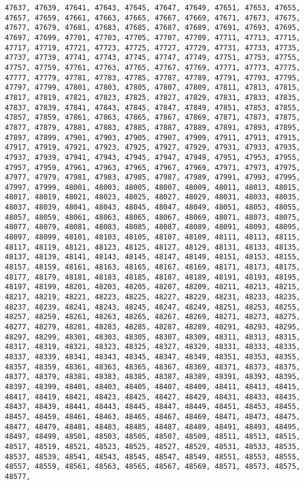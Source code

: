 \documentclass[11pt]{article}
\begin{document}
\begin{Verbatim}[commandchars=\\\{\}]
47637, 47639, 47641, 47643, 47645, 47647, 47649, 47651, 47653, 47655, 47657, 47659, 47661, 47663, 47665, 47667, 47669, 47671, 47673, 47675, 47677, 47679, 47681, 47683, 47685, 47687, 47689, 47691, 47693, 47695, 47697, 47699, 47701, 47703, 47705, 47707, 47709, 47711, 47713, 47715, 47717, 47719, 47721, 47723, 47725, 47727, 47729, 47731, 47733, 47735, 47737, 47739, 47741, 47743, 47745, 47747, 47749, 47751, 47753, 47755, 47757, 47759, 47761, 47763, 47765, 47767, 47769, 47771, 47773, 47775, 47777, 47779, 47781, 47783, 47785, 47787, 47789, 47791, 47793, 47795, 47797, 47799, 47801, 47803, 47805, 47807, 47809, 47811, 47813, 47815, 47817, 47819, 47821, 47823, 47825, 47827, 47829, 47831, 47833, 47835, 47837, 47839, 47841, 47843, 47845, 47847, 47849, 47851, 47853, 47855, 47857, 47859, 47861, 47863, 47865, 47867, 47869, 47871, 47873, 47875, 47877, 47879, 47881, 47883, 47885, 47887, 47889, 47891, 47893, 47895, 47897, 47899, 47901, 47903, 47905, 47907, 47909, 47911, 47913, 47915, 47917, 47919, 47921, 47923, 47925, 47927, 47929, 47931, 47933, 47935, 47937, 47939, 47941, 47943, 47945, 47947, 47949, 47951, 47953, 47955, 47957, 47959, 47961, 47963, 47965, 47967, 47969, 47971, 47973, 47975, 47977, 47979, 47981, 47983, 47985, 47987, 47989, 47991, 47993, 47995, 47997, 47999, 48001, 48003, 48005, 48007, 48009, 48011, 48013, 48015, 48017, 48019, 48021, 48023, 48025, 48027, 48029, 48031, 48033, 48035, 48037, 48039, 48041, 48043, 48045, 48047, 48049, 48051, 48053, 48055, 48057, 48059, 48061, 48063, 48065, 48067, 48069, 48071, 48073, 48075, 48077, 48079, 48081, 48083, 48085, 48087, 48089, 48091, 48093, 48095, 48097, 48099, 48101, 48103, 48105, 48107, 48109, 48111, 48113, 48115, 48117, 48119, 48121, 48123, 48125, 48127, 48129, 48131, 48133, 48135, 48137, 48139, 48141, 48143, 48145, 48147, 48149, 48151, 48153, 48155, 48157, 48159, 48161, 48163, 48165, 48167, 48169, 48171, 48173, 48175, 48177, 48179, 48181, 48183, 48185, 48187, 48189, 48191, 48193, 48195, 48197, 48199, 48201, 48203, 48205, 48207, 48209, 48211, 48213, 48215, 48217, 48219, 48221, 48223, 48225, 48227, 48229, 48231, 48233, 48235, 48237, 48239, 48241, 48243, 48245, 48247, 48249, 48251, 48253, 48255, 48257, 48259, 48261, 48263, 48265, 48267, 48269, 48271, 48273, 48275, 48277, 48279, 48281, 48283, 48285, 48287, 48289, 48291, 48293, 48295, 48297, 48299, 48301, 48303, 48305, 48307, 48309, 48311, 48313, 48315, 48317, 48319, 48321, 48323, 48325, 48327, 48329, 48331, 48333, 48335, 48337, 48339, 48341, 48343, 48345, 48347, 48349, 48351, 48353, 48355, 48357, 48359, 48361, 48363, 48365, 48367, 48369, 48371, 48373, 48375, 48377, 48379, 48381, 48383, 48385, 48387, 48389, 48391, 48393, 48395, 48397, 48399, 48401, 48403, 48405, 48407, 48409, 48411, 48413, 48415, 48417, 48419, 48421, 48423, 48425, 48427, 48429, 48431, 48433, 48435, 48437, 48439, 48441, 48443, 48445, 48447, 48449, 48451, 48453, 48455, 48457, 48459, 48461, 48463, 48465, 48467, 48469, 48471, 48473, 48475, 48477, 48479, 48481, 48483, 48485, 48487, 48489, 48491, 48493, 48495, 48497, 48499, 48501, 48503, 48505, 48507, 48509, 48511, 48513, 48515, 48517, 48519, 48521, 48523, 48525, 48527, 48529, 48531, 48533, 48535, 48537, 48539, 48541, 48543, 48545, 48547, 48549, 48551, 48553, 48555, 48557, 48559, 48561, 48563, 48565, 48567, 48569, 48571, 48573, 48575, 48577, 
\end{Verbatim}
\end{document}
